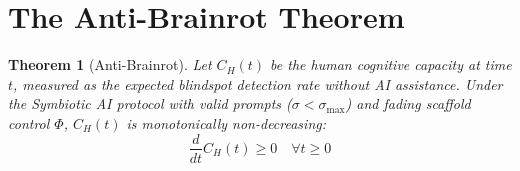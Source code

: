 \documentclass[12pt,a4paper]{article}
\newtheorem{theorem}{Theorem}[section]
\theoremstyle{remark}
\begin{document}
\section{The Anti-Brainrot Theorem}

\begin{theorem}[Anti-Brainrot]
Let $C_H(t)$ be the human cognitive capacity at time $t$, measured as the expected blindspot detection rate without AI assistance. Under the Symbiotic AI protocol with valid prompts ($\sigma < \sigma_{\max}$) and fading scaffold control $\Phi$, $C_H(t)$ is monotonically non-decreasing:
\begin{equation}
\frac{d}{dt}C_H(t) \geq 0 \quad \forall t \geq 0
\label{eq:anti-brainrot}
\end{equation}
\end{theorem}
\end{document}
